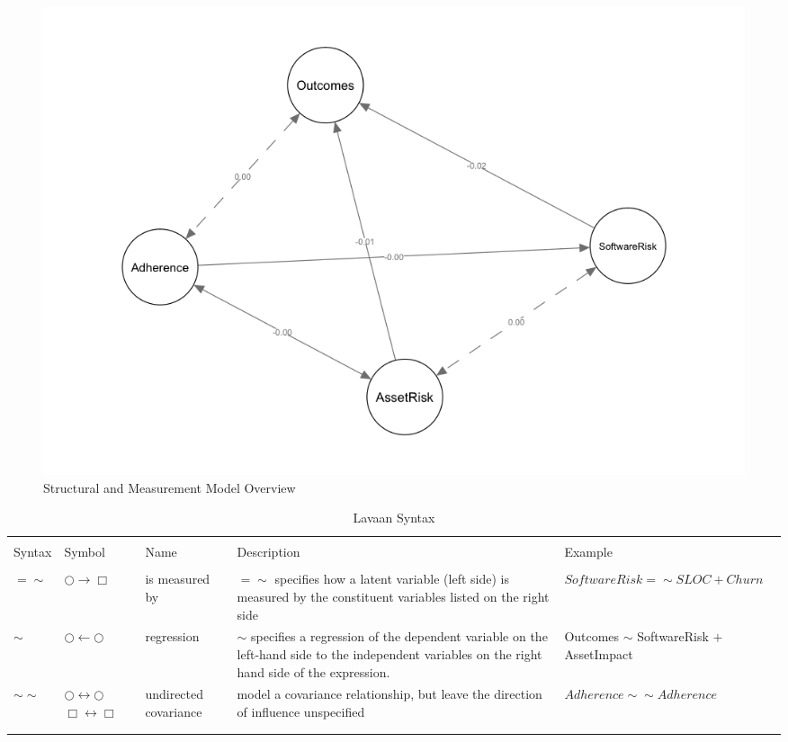  \begin{figure}
 	\includegraphics[width=\columnwidth]{modelzeroB.png}
 	\caption{Structural and Measurement Model Overview}
 	\label{fig:model_constructs}
 \end{figure}
  
\begin{table}[!htbp] \centering 
	\caption{Lavaan Syntax} 
	\label{tab:model_lavaan_syntax} 
	\begin{small}
		\begin{tabular}{p{.75cm}p{1.25cm}p{1cm}p{5cm}p{4cm}} 
			&&&&\\[-1.8ex]\hline 
			\hline&&&& \\[-1.8ex] 
			Syntax & Symbol & Name & Description & Example \\ 
			\hline &&&&\\[-1.8ex]  
			$=\sim$	& $\bigcirc \rightarrow \Box$ & is measured by & $=\sim$ specifies how a latent variable (left side) is measured by the constituent variables listed on the right side & $SoftwareRisk =\sim SLOC + Churn$\\	
			 $\sim$ & $\bigcirc \leftarrow \bigcirc$ & regression & $\sim$ specifies a regression of the dependent variable on the left-hand side to the independent variables on the right hand side of the expression. & Outcomes $\sim$ SoftwareRisk $+$ AssetImpact  \\	
			 $\sim\sim$ & $\bigcirc \leftrightarrow \bigcirc$ $\Box \leftrightarrow \Box$ & undirected covariance & model a covariance relationship, but leave the direction of influence unspecified & $Adherence \sim\sim Adherence$\\
			\hline &&&&\\[-1.8ex] 
			\hline &&&&\\[-1.8ex] 
		\end{tabular} 
	\end{small}
\end{table} 


